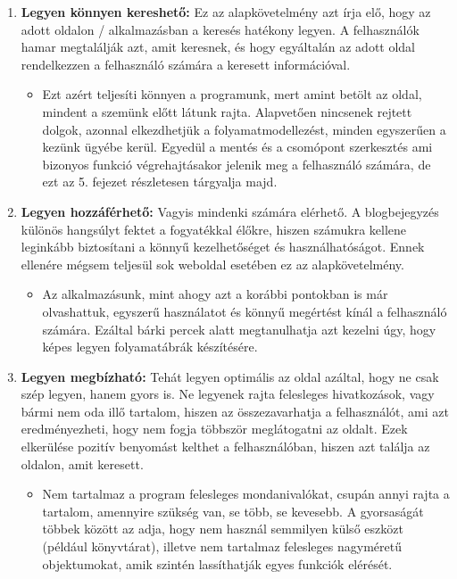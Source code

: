 \begin{enumerate}
\item \textbf{Legyen könnyen kereshető:} Ez az alapkövetelmény azt írja elő, hogy az adott oldalon / alkalmazásban a keresés hatékony legyen. A felhasználók hamar megtalálják azt, amit keresnek, és hogy egyáltalán az adott oldal rendelkezzen a felhasználó számára a keresett információval.

\begin{itemize}
\item Ezt azért teljesíti könnyen a programunk, mert amint betölt az oldal, mindent a szemünk előtt látunk rajta. Alapvetően nincsenek rejtett dolgok, azonnal elkezdhetjük a folyamatmodellezést, minden egyszerűen a kezünk ügyébe kerül. Egyedül a mentés és a csomópont szerkesztés ami bizonyos funkció végrehajtásakor jelenik meg a felhasználó számára, de ezt az 5. fejezet részletesen tárgyalja majd.
\end{itemize}

\item \textbf{Legyen hozzáférhető:} Vagyis mindenki számára elérhető. A blogbejegyzés különös hangsúlyt fektet a fogyatékkal élőkre, hiszen számukra kellene leginkább biztosítani a könnyű kezelhetőséget és használhatóságot. Ennek ellenére mégsem teljesül sok weboldal esetében ez az alapkövetelmény.

\begin{itemize}
\item Az alkalmazásunk, mint ahogy azt a korábbi pontokban is már olvashattuk, egyszerű használatot és könnyű megértést kínál a felhasználó számára. Ezáltal bárki percek alatt megtanulhatja azt kezelni úgy, hogy képes legyen folyamatábrák készítésére.
\end{itemize}

\item \textbf{Legyen megbízható:} Tehát legyen optimális az oldal azáltal, hogy ne csak szép legyen, hanem gyors is. Ne legyenek rajta felesleges hivatkozások, vagy bármi nem oda illő tartalom, hiszen az összezavarhatja a felhasználót, ami azt eredményezheti, hogy nem fogja többször meglátogatni az oldalt. Ezek elkerülése pozitív benyomást kelthet a felhasználóban, hiszen azt találja az oldalon, amit keresett.

\begin{itemize}
\item Nem tartalmaz a program felesleges mondanivalókat, csupán annyi rajta a tartalom, amennyire szükség van, se több, se kevesebb. A gyorsaságát többek között az adja, hogy nem használ semmilyen külső eszközt (például könyvtárat), illetve nem tartalmaz felesleges nagyméretű objektumokat, amik szintén lassíthatják egyes funkciók elérését.
\end{itemize}

\end{enumerate}
